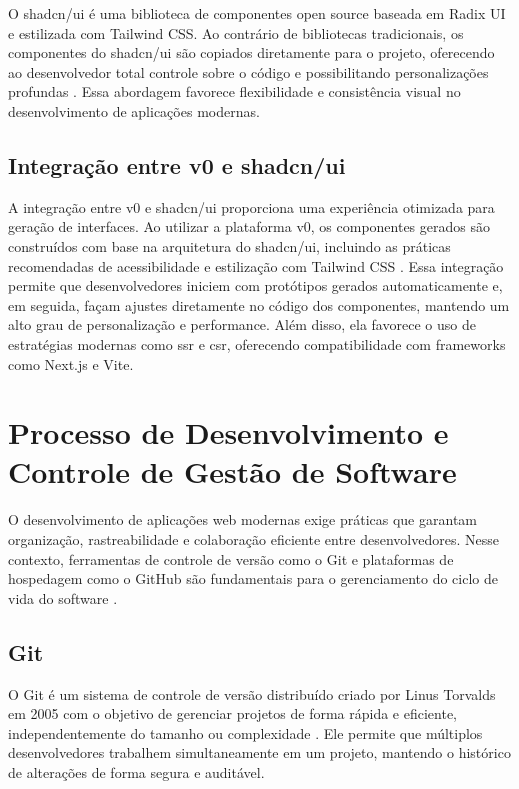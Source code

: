 O shadcn/ui é uma biblioteca de componentes open source baseada em Radix UI e estilizada com Tailwind CSS. Ao contrário de bibliotecas tradicionais, os componentes do shadcn/ui são copiados diretamente para o projeto, oferecendo ao desenvolvedor total controle sobre o código e possibilitando personalizações profundas \cite{shadcn_docs}. Essa abordagem favorece flexibilidade e consistência visual no desenvolvimento de aplicações modernas.

\subsection{Integração entre v0 e shadcn/ui}
\label{subsec:integracao-v0-shadcn}

A integração entre v0 e shadcn/ui proporciona uma experiência otimizada para geração de interfaces. Ao utilizar a plataforma v0, os componentes gerados são construídos com base na arquitetura do shadcn/ui, incluindo as práticas recomendadas de acessibilidade e estilização com Tailwind CSS \cite{v0_docs, shadcn_docs}. Essa integração permite que desenvolvedores iniciem com protótipos gerados automaticamente e, em seguida, façam ajustes diretamente no código dos componentes, mantendo um alto grau de personalização e performance. Além disso, ela favorece o uso de estratégias modernas como \acrshort{ssr} e \acrshort{csr}, oferecendo compatibilidade com frameworks como Next.js e Vite.




\section{Processo de Desenvolvimento e Controle de Gestão de Software}
\label{sec:git-github}

O desenvolvimento de aplicações web modernas exige práticas que garantam organização, rastreabilidade e colaboração eficiente entre desenvolvedores. Nesse contexto, ferramentas de controle de versão como o Git e plataformas de hospedagem como o GitHub são fundamentais para o gerenciamento do ciclo de vida do software \cite{github_official}.

\subsection{Git}
\label{subsec:git}

O Git é um sistema de controle de versão distribuído criado por Linus Torvalds em 2005 com o objetivo de gerenciar projetos de forma rápida e eficiente, independentemente do tamanho ou complexidade \cite{chacon_git}. Ele permite que múltiplos desenvolvedores trabalhem simultaneamente em um projeto, mantendo o histórico de alterações de forma segura e auditável.

